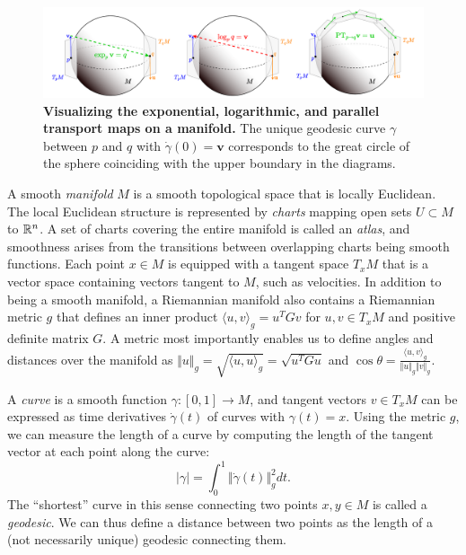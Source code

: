 \begin{figure}[t!]
    \includegraphics[width=\linewidth]{figures/manifolds.drawio.pdf}
    \caption{\label{fig:manifolds}\textbf{Visualizing the exponential, logarithmic, and parallel transport maps on a manifold.} The unique geodesic curve $\gamma$ between $p$ and $q$ with $\dot \gamma(0) = \mathbf{v}$ corresponds to the great circle of the sphere coinciding with the upper boundary in the diagrams.}    
\end{figure}

A smooth \textit{manifold} $M$ is a smooth topological space that is locally Euclidean. The local Euclidean structure is represented by \textit{charts} mapping open sets $U \subset M$ to $\mathbb{R}^n$. A set of charts covering the entire manifold is called an \textit{atlas}, and smoothness arises from the transitions between overlapping charts being smooth functions. Each point $x \in M$ is equipped with a tangent space $T_x M$ that is a vector space containing vectors tangent to $M$, such as velocities. In addition to being a smooth manifold, a Riemannian manifold also contains a Riemannian metric $g$ that defines an inner product $\langle u, v \rangle_g = u^T G v$ for $u, v \in T_x M$ and positive definite matrix $G$. A metric most importantly enables us to define angles and distances over the manifold as $\Vert u \Vert_g = \sqrt{\langle u, u\rangle_g} = \sqrt{u^T G u}$ and $\cos \theta = \frac{\langle u, v \rangle_g}{\Vert u \Vert_g \Vert v \Vert_g}$. 

A \textit{curve} is a smooth function $\gamma: [0, 1] \to M$, and tangent vectors $v \in T_x M$ can be expressed as time derivatives $\dot \gamma(t)$ of curves with $\gamma(t) = x$. Using the metric $g$, we can measure the length of a curve by computing the length of the tangent vector at each point along the curve:
\begin{equation}
    \vert \gamma \vert =
    \int_0^1 \Vert \dot \gamma (t) \Vert_g^2 dt.
\end{equation}
The ``shortest'' curve in this sense connecting two points $x,y\in M$ is called a \textit{geodesic}. We can thus define a distance between two points as the length of a (not necessarily unique) geodesic connecting them. 

